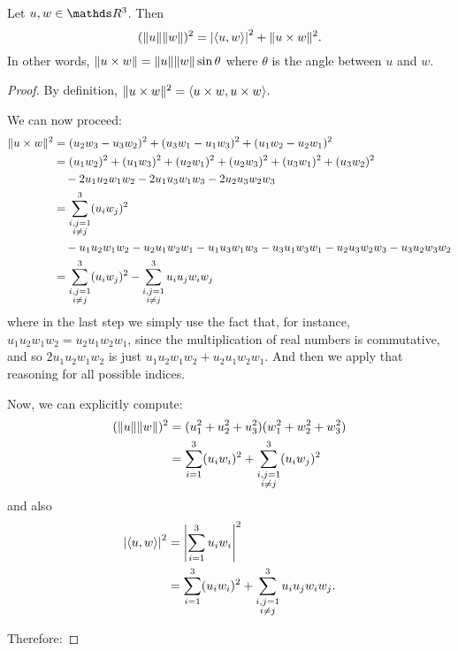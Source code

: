 \begin{theorem}
	Let $u,w\in \R^3$. Then $$(\lVert u\rVert\lVert w\rVert)^2=\left\vert\langle u,w\rangle\right\vert^2+\lVert u\times w\rVert^2.$$In other words, $\lVert u\times w\rVert=\lVert u\rVert\lVert w\rVert\sin\theta$ where $\theta$ is the angle between $u$ and $w$.
\end{theorem}
\begin{proof}
	By definition, $\lVert u\times w\rVert^2=\langle u\times w,u\times w\rangle$.
	
	We can now proceed:
	\begin{align*}
		\lVert u\times w\rVert^2&=(u_2w_3-u_3w_2)^2+(u_3w_1-u_1w_3)^2+(u_1w_2-u_2w_1)^2\\
		&=(u_1w_2)^2+(u_1w_3)^2+(u_2w_1)^2+(u_2w_3)^2+(u_3w_1)^2+(u_3w_2)^2\\
		&\quad-2u_1u_2w_1w_2-2u_1u_3w_1w_3-2u_2u_3w_2w_3\\
		&=\sum_{\substack{i,j=1\\i\neq j
		}}^3(u_iw_j)^2\\
		&\quad-u_1u_2w_1w_2-u_2u_1w_2w_1-u_1u_3w_1w_3-u_3u_1w_3w_1-u_2u_3w_2w_3-u_3u_2w_3w_2\\
		&=\sum_{\substack{i,j=1\\i\neq j
		}}^3(u_iw_j)^2-\sum_{\substack{i,j=1\\i\neq j}}^3u_iu_jw_iw_j
	\end{align*}where in the last step we simply use the fact that, for instance, $u_1u_2w_1w_2=u_2u_1w_2w_1$, since the multiplication of real numbers is commutative, and so $2u_1u_2w_1w_2$ is just $u_1u_2w_1w_2+u_2u_1w_2w_1$. And then we apply that reasoning for all possible indices.
	
	Now, we can explicitly compute:
	\begin{align*}
		(\lVert u\rVert\lVert w\rVert)^2&=(u_1^2+u_2^2+u_3^2)(w_1^2+w_2^2+w_3^2)\\
		&=\sum_{i=1}^3(u_iw_i)^2+\sum_{\substack{i,j=1\\i\neq j
		}}^3(u_iw_j)^2
	\end{align*}and also
	\begin{align*}
		\left\vert\langle u,w\rangle\right\vert^2&=\left\vert\sum_{i=1}^3u_iw_i\right\vert^2\\
		&=\sum_{i=1}^3(u_iw_i)^2+\sum_{\substack{i,j=1\\i\neq j}}^3u_iu_jw_iw_j.
	\end{align*}
	
	Therefore:
	

\end{proof}
